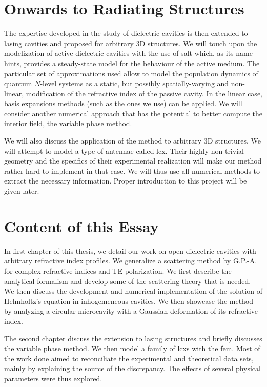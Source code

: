 \section{Onwards to Radiating Structures}
The expertise developed in the study of dielectric cavities is then
extended to lasing cavities and proposed for arbitrary
3D structures. We will touch upon the modelization of active
dielectric cavities with the use of \gls{salt} which, as its name
hints, provides a steady-state model for the behaviour of the 
active medium. The particular set of approximations used 
allow to model the population dynamics of quantum $N$-level
systems as a static, but possibly spatially-varying and non-linear, 
modification of the refractive index of the passive cavity. 
In the linear case, basis expansions methods (such as the ones
we use) can be applied. We will consider another numerical approach
that has the potential to better compute the interior field, the
variable phase method. 

We will also discuss the application of the method to arbitrary 
3D structures. We will attempt to model a type of antennae 
called \gls{lcx}. Their highly non-trivial geometry and the specifics
of their experimental realization will make our method rather hard 
to implement in that case. We will thus use all-numerical methods 
to extract the necessary information. Proper introduction to this project
will be given later.

\section{Content of this Essay}

In first chapter of this thesis, we detail our work on open
dielectric cavities with arbitrary refractive index profiles. 
We generalize a scattering method by G.P.-A. \cite{GAP2013a} for 
complex refractive indices and TE polarization. We first describe
the analytical formalism and develop some of the scattering theory 
that is needed. We then discuss the development and numerical implementation
of the solution of Helmholtz's equation in inhogemeneous cavities. 
We then showcase the method by analyzing a circular microcavity with a 
Gaussian deformation of its refractive index. 

The second chapter discuss the extension to lasing structures and briefly
discusses the variable phase method. We then model a family of \glspl{lcx}
with the \gls{fem}. Most of the work done aimed to reconciliate the 
experimental and theoretical data sets, mainly by explaining the source
of the discrepancy. The effects of several physical parameters were thus explored. 

